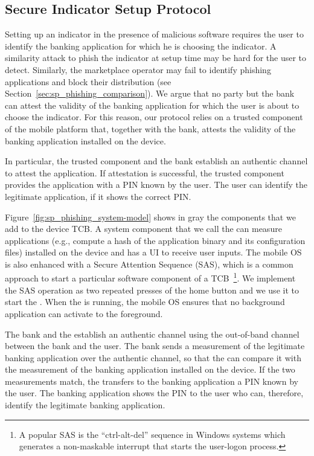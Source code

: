 \subsection{Secure Indicator Setup Protocol}
\label{sec:setup:sp_phishing_protocol}

Setting up an indicator in the presence of malicious software requires the user to identify the banking application for which he is choosing the indicator.
A similarity attack to phish the indicator at setup time may be hard for the user to detect.
Similarly, the marketplace operator may fail to identify phishing applications and block their distribution (see Section~\ref{sec:sp_phishing_comparison}).
We argue that no party but the bank can attest the validity of the banking application for which the user is about to choose the indicator.
For this reason, our protocol relies on a trusted component of the mobile platform that, together with the bank, attests the validity of the banking application installed on the device.

In particular, the trusted component and the bank establish an authentic channel to attest the application.
If attestation is successful, the trusted component provides the application with a PIN known by the user. 
The user can identify the legitimate application, if it shows the correct PIN.

Figure~\ref{fig:sp_phishing_system-model} shows in gray the components that we add to the device TCB.
A system component that we call the \secmodule{} can measure applications (e.g., compute a hash of the application binary and its configuration files) installed on the device and has a UI to receive user inputs.
The mobile OS is also enhanced with a Secure Attention Sequence (SAS), which is a common approach to start a particular software component of a TCB~\cite{gligor87tse, mccune09ndss, libonati11ndss}\footnote{A popular SAS is the ``ctrl-alt-del'' sequence in Windows systems which generates a non-maskable interrupt that starts the user-logon process.}.
We implement the SAS operation as two repeated presses of the home button and we use it to start the \secmodule{}.
When the \secmodule{} is running, the mobile OS ensures that no background application can activate to the foreground.

The bank and the \secmodule{} establish an authentic channel using the out-of-band channel between the bank and the user.
The bank sends a measurement of the legitimate banking application over the authentic channel, so that the \secmodule{} can compare it with the measurement of the banking application installed on
the device. If the two measurements match, the \secmodule{} transfers to the banking application a PIN known by the user.
The banking application shows the PIN to the user who can, therefore, identify the legitimate banking application.

